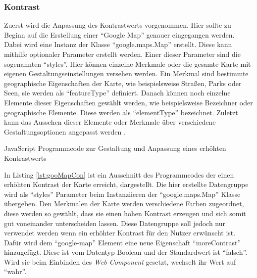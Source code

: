 \documentclass[12pt, paper=a4, bibtotoc, toc=listof, headsepline=true, numbers=endperiod]{scrreprt}
\begin{document}
	\subsubsection{Kontrast}
	Zuerst wird die Anpassung des Kontrastwerts vorgenommen. Hier sollte zu Beginn auf die Erstellung einer \enquote{Google Map} genauer eingegangen werden. Dabei wird eine Instanz der Klasse \enquote{google.maps.Map} erstellt. Diese kann mithilfe optionaler Parameter erstellt werden. Einer dieser Parameter sind die sogenannten \enquote{styles}. Hier können einzelne Merkmale oder die gesamte Karte mit eigenen Gestaltungseinstellungen versehen werden. Ein Merkmal sind bestimmte geographische Eigenschaften der Karte, wie beispielsweise Straßen, Parks oder Seen, sie werden als \enquote{featureType} definiert. Danach können noch einzelne Elemente dieser Eigenschaften gewählt werden, wie beispielsweise Bezeichner oder geographische Elemente. Diese werden als \enquote{elementType} bezeichnet. Zuletzt kann das Aussehen dieser Elemente oder Merkmale über verschiedene Gestaltungsoptionen angepasst werden \cite{gmapStyle}.
\begin{listing}[H]
		\caption[Anpassung zur Erhöhung des Kontrastwerts]{JavaScript Programmcode zur Gestaltung und Anpassung eines erhöhten Kontrastwerts}
		\label{lst:gooMapCon}
\end{listing}\noindent
In Listing \ref{lst:gooMapCon} ist ein Ausschnitt des Programmcodes der einen erhöhten Kontrast der Karte erreicht, dargestellt. Die hier erstellte Datengruppe wird als \enquote{styles} Parameter beim Instanziieren der \enquote{google.maps.Map} Klasse übergeben. Den Merkmalen der Karte werden verschiedene Farben zugeordnet, diese werden so gewählt, dass sie einen hohen Kontrast erzeugen und sich somit gut voneinander unterscheiden lassen. Diese Datengruppe soll jedoch nur verwendet werden wenn ein erhöhter Kontrast für den Nutzer erwünscht ist. Dafür wird dem \enquote{google-map} Element eine neue Eigenschaft \enquote{moreContrast} hinzugefügt. Diese ist vom Datentyp Boolean und der Standardwert ist \enquote{falsch}. Wird sie beim Einbinden des \emph{Web Component} gesetzt, wechselt ihr Wert auf \enquote{wahr}. 
\end{document}
